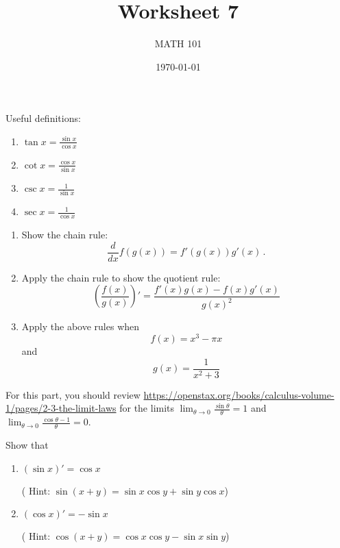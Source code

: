 \documentclass[12pt]{amsart}
\title{ Worksheet 7}
\author{MATH 101}
\date{\today}
\begin{document}
\maketitle

Useful definitions:

\begin{enumerate}
	\item $\displaystyle \tan x = \frac{\sin x}{\cos x}$
	\item $\displaystyle \cot x = \frac{\cos x}{\sin x}$
	\item $\displaystyle \csc x = \frac{1}{\sin x}$
	\item $\displaystyle \sec x = \frac{1}{\cos x}$
\end{enumerate}




\begin{question}
	\begin{enumerate}
		\item Show the chain rule:
		      \begin{equation*}
			      \frac{d}{dx} f(g(x)) = f'(g(x)) g'(x) \,.
		      \end{equation*}
		      \vspace{7cm}

		\item Apply the chain rule to show the quotient rule:
		      \begin{equation*}
			      \left( \frac{f(x)}{g(x)}  \right)' = \frac{ f'(x) g(x) - f(x) g'(x)}{g(x)^2}
		      \end{equation*}
		      \vspace{5cm}


		\item Apply the above rules when
		      $$f(x) = x^3 -\pi x$$
		      and
		      $$ g(x) = \frac{1}{x^2 + 3} $$
		      \vspace{5cm}

	\end{enumerate}
\end{question}
\newpage

\begin{question}
	For this part, you should review \url{https://openstax.org/books/calculus-volume-1/pages/2-3-the-limit-laws}
	for the limits $\lim_{\theta \to 0} \frac{\sin \theta }{\theta} = 1$
	and
	$\lim_{\theta \to 0} \frac{\cos \theta - 1}{\theta} = 0$.

	Show that
	\begin{enumerate}
		\item $(\sin x)' = \cos x$

		      ( Hint: $\sin(x + y) = \sin x \cos y + \sin y \cos x$)
		      \vspace{5cm}

		\item $(\cos x)' = - \sin x$

		      ( Hint: $\cos(x + y) = \cos x \cos y - \sin x \sin y$)
		      \vspace{5cm}
	\end{enumerate}
\end{question}
\end{document}

